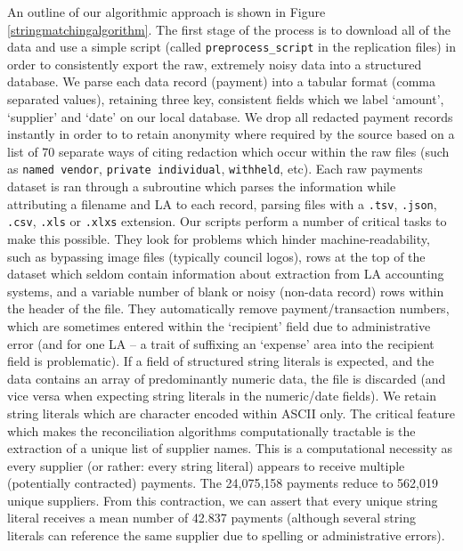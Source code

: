 \documentclass[11pt]{article}
\begin{document}
An outline of our algorithmic approach is shown in Figure \ref{stringmatchingalgorithm}. The first stage of the process is to download all of the data and use a simple script (called \texttt{preprocess\_script} in the replication files) in order to consistently export the raw, extremely noisy data into a structured database. We parse each data record (payment) into a tabular format (comma separated values), retaining three key, consistent fields which we label `amount', `supplier' and `date' on our local database. We drop all redacted payment records instantly in order to to retain anonymity where required by the source based on a list of 70 separate ways of citing redaction which occur within the raw files (such as \texttt{named vendor}, \texttt{private individual}, \texttt{withheld}, etc). Each raw payments dataset is ran through a subroutine which parses the information while attributing a filename and LA to each record, parsing files with a \texttt{.tsv}, \texttt{.json}, \texttt{.csv}, \texttt{.xls} or \texttt{.xlxs} extension. Our scripts perform a number of critical tasks to make this possible. They look for problems which hinder machine-readability, such as bypassing image files (typically council logos), rows at the top of the dataset which seldom contain information about extraction from LA accounting systems, and a variable number of blank or noisy (non-data record) rows within the header of the file. They automatically remove payment/transaction numbers, which are sometimes entered within the `recipient' field due to administrative error (and for one LA -- a trait of suffixing an `expense' area into the recipient field is problematic). If a field of structured string literals is expected, and the data contains an array of predominantly numeric data, the file is discarded (and vice versa when expecting string literals in the numeric/date fields). We retain string literals which are character encoded within ASCII only. The critical feature which makes the reconciliation algorithms computationally tractable is the extraction of a unique list of supplier names. This is a computational necessity as every supplier (or rather: every string literal) appears to receive multiple (potentially contracted) payments. The 24,075,158 payments reduce to 562,019 unique suppliers. From this contraction, we can assert that every unique string literal receives a mean number of 42.837 payments (although several string literals can reference the same supplier due to spelling or administrative errors).
\end{document}
